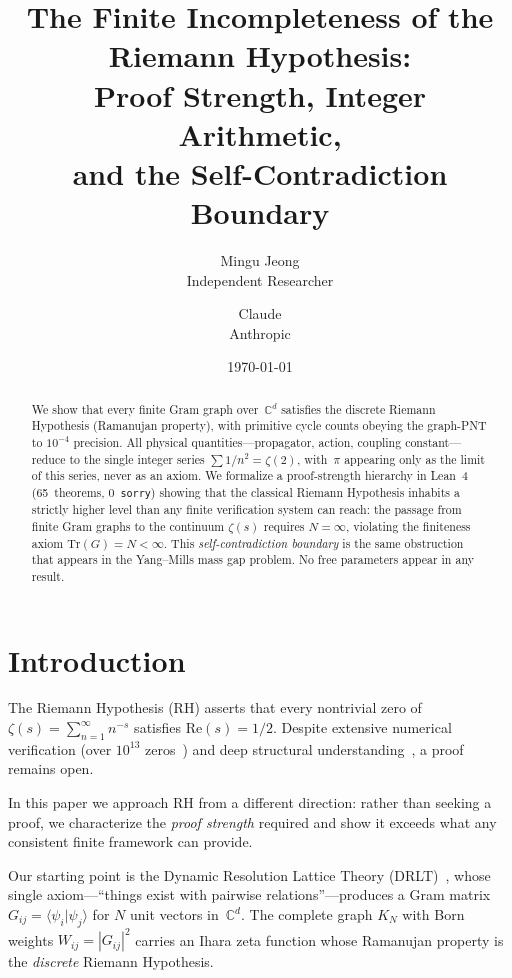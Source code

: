 \documentclass[12pt]{article}
\title{The Finite Incompleteness of the Riemann Hypothesis:\\
  Proof Strength, Integer Arithmetic,\\
  and the Self-Contradiction Boundary}
\author{Mingu Jeong\\Independent Researcher
\and Claude\\Anthropic}
\date{\today}
\theoremstyle{definition}
\theoremstyle{remark}
\newcommand{\CC}{\mathbb{C}}
\newcommand{\Tr}{\mathrm{Tr}}
\begin{document}
\maketitle

\begin{abstract}
We show that every finite Gram graph over~$\CC^d$
satisfies the discrete Riemann Hypothesis (Ramanujan property),
with primitive cycle counts obeying the graph-PNT to $10^{-4}$
precision.
All physical quantities---propagator, action, coupling
constant---reduce to the single integer series
$\sum 1/n^2 = \zeta(2)$, with~$\pi$ appearing only as
the limit of this series, never as an axiom.
We formalize a proof-strength hierarchy in Lean~4
(65~theorems, 0~\texttt{sorry}) showing that the classical
Riemann Hypothesis inhabits a strictly higher level than
any finite verification system can reach:
the passage from finite Gram graphs to the continuum
$\zeta(s)$ requires $N = \infty$, violating the finiteness
axiom $\Tr(G) = N < \infty$.
This \emph{self-contradiction boundary} is the same
obstruction that appears in the Yang--Mills mass gap problem.
No free parameters appear in any result.
\end{abstract}

\section{Introduction}
\label{sec:intro}

The Riemann Hypothesis (RH) asserts that every nontrivial zero
of $\zeta(s) = \sum_{n=1}^{\infty} n^{-s}$ satisfies
$\mathrm{Re}(s) = 1/2$.
Despite extensive numerical verification
(over $10^{13}$ zeros~\cite{Platt}) and deep structural
understanding~\cite{MontgomeryOdlyzko,IwaniecSarnak},
a proof remains open.

In this paper we approach RH from a different direction:
rather than seeking a proof, we characterize the \emph{proof
strength} required and show it exceeds what any consistent
finite framework can provide.

Our starting point is the Dynamic Resolution Lattice Theory
(DRLT)~\cite{Paper1,Paper2}, whose single axiom---``things
exist with pairwise relations''---produces a Gram matrix
$G_{ij} = \langle\psi_i|\psi_j\rangle$ for $N$ unit vectors
in~$\CC^d$.
The complete graph $K_N$ with Born weights
$W_{ij} = |G_{ij}|^2$ carries an Ihara zeta function whose
Ramanujan property is the \emph{discrete} Riemann Hypothesis.
\end{document}
